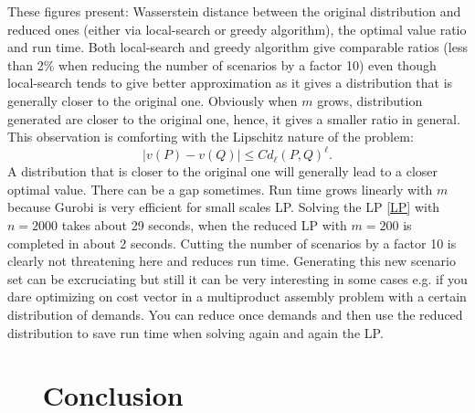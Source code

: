 \documentclass{amsart}
\begin{document}
These figures present: Wasserstein distance between the original distribution and reduced ones (either via local-search or greedy algorithm), the optimal value ratio and run time. Both local-search and greedy algorithm give comparable ratios (less than 2\% when reducing the number of scenarios by a factor 10) even though local-search tends to give better approximation as it gives a distribution that is generally closer to the original one. Obviously when $m$ grows, distribution generated are closer to the original one, hence, it gives a smaller ratio in general. This observation is comforting with the Lipschitz nature of the problem: $$\lvert v\left(P\right)-v\left(Q\right)\rvert \leq C d_\ell\left(P,Q\right)^\ell.$$ A distribution that is closer to the original one will generally lead to a closer optimal value. There can be a gap sometimes. Run time grows linearly with $m$ because Gurobi is very efficient for small scales LP. Solving the LP \ref{LP} with $n=2000$ takes about 29 seconds, when the reduced LP with $m=200$ is completed in about 2 seconds. Cutting the number of scenarios by a factor 10 is clearly not threatening here and reduces run time. Generating this new scenario set can be excruciating but still it can be very interesting in some cases e.g. if you dare optimizing on cost vector in a multiproduct assembly problem with a certain distribution of demands. You can reduce once demands and then use the reduced distribution to save run time when solving again and again the LP.
\section{$\quad$ Conclusion}
\clearpage


\clearpage
\end{document}
